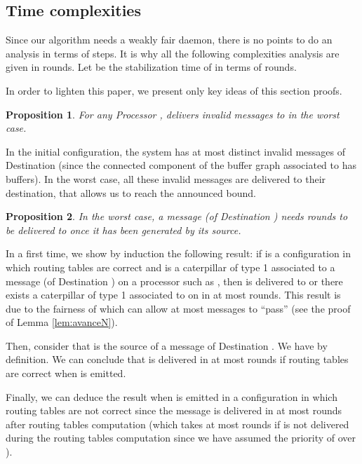 \documentclass[11pt]{article}
\newtheorem{proposition}{Proposition}
\newenvironment{sketchproof}{{\noindent\bf Sketch of proof. } }{{\hfill }}
\begin{document}
\subsection{Time complexities}\label{sub:analyseN}

Since our algorithm needs a weakly fair daemon, there is no points to do an analysis in terms of steps. It is why all the following complexities analysis are given in rounds. Let  be the stabilization time of  in terms of rounds.

In order to lighten this paper, we present only key ideas of this section proofs.

\begin{proposition} \label{prop:analysemesN}
For any Processor , \AN delivers  invalid messages to  in the worst case.
\end{proposition}

\begin{sketchproof}
In the initial configuration, the system has at most  distinct invalid messages of Destination  (since the connected component of the buffer graph associated to  has  buffers). In the worst case, all these invalid messages are delivered to their destination, that allows us to reach the announced bound.
\end{sketchproof}

\begin{proposition} \label{prop:complexiteN}
In the worst case, a message  (of Destination ) needs  rounds to be delivered to  once it has been generated by its source.
\end{proposition}

\begin{sketchproof}
In a first time, we show by induction the following result: if  is a configuration in which routing tables are correct and  is a caterpillar of type 1 associated to a message  (of Destination ) on a processor  such as , then  is delivered to  or there exists a caterpillar of type 1 associated to  on  in at most  rounds. This result is due to the fairness of  which can allow at most  messages to ``pass''  (see the proof of Lemma \ref{lem:avanceN}). 

Then, consider that  is the source of a message  of Destination . We have  by definition. We can conclude that  is delivered in at most  rounds if routing tables are correct when  is emitted. 

Finally, we can deduce the result when  is emitted in a configuration in which routing tables are not correct since the message is delivered in at most  rounds after routing tables computation (which takes at most  rounds if  is not delivered during the routing tables computation since we have assumed the priority of  over \AN).
\end{sketchproof}
\end{document}
